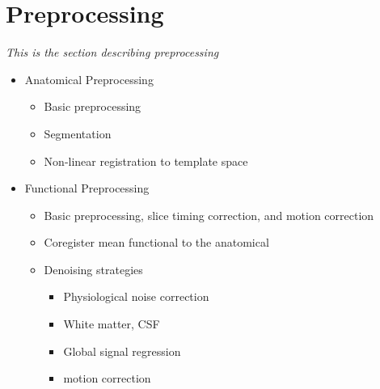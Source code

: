 \section{Preprocessing}
\textit{This is the section describing preprocessing}

\begin{itemize}
    \item Anatomical Preprocessing
    \begin{itemize}
        \item Basic preprocessing
        \item Segmentation
        \item Non-linear registration to template space
    \end{itemize}
    \item Functional Preprocessing
    \begin{itemize}
        \item Basic preprocessing, slice timing correction, and motion correction
        \item Coregister mean functional to the anatomical
        \item Denoising strategies
        \begin{itemize}
            \item Physiological noise correction
            \item White matter, CSF
            \item Global signal regression
            \item motion correction
        \end{itemize}
    \end{itemize}
\end{itemize}
